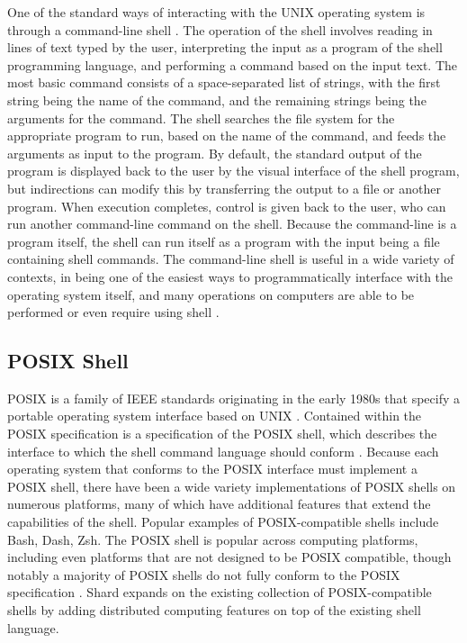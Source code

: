 \documentclass[twoside]{report}
\begin{document}
One of the standard ways of interacting with the UNIX operating system is through a command-line shell \cite{10.1145/361011.361061}.
The operation of the shell involves reading in lines of text typed by the user, interpreting the input as a program of the shell programming language, and performing a command based on the input text.
The most basic command consists of a space-separated list of strings, with the first string being the name of the command, and the remaining strings being the arguments for the command.
The shell searches the file system for the appropriate program to run, based on the name of the command, and feeds the arguments as input to the program.
By default, the standard output of the program is displayed back to the user by the visual interface of the shell program, but indirections can modify this by transferring the output to a file or another program.
When execution completes, control is given back to the user, who can run another command-line command on the shell.
Because the command-line is a program itself, the shell can run itself as a program with the input being a file containing shell commands.
The command-line shell is useful in a wide variety of contexts, in being one of the easiest ways to programmatically interface with the operating system itself, and many operations on computers are able to be performed or even require using shell \cite{10.1145/3371111}.

\subsection{POSIX Shell}
POSIX is a family of IEEE standards originating in the early 1980s that specify a portable operating system interface based on UNIX \cite{10.1145/210308.210315}.
Contained within the POSIX specification is a specification of the POSIX shell, which describes the interface to which the shell command language should conform \cite{posix2017}.
Because each operating system that conforms to the POSIX interface must implement a POSIX shell, there have been a wide variety implementations of POSIX shells on numerous platforms, many of which have additional features that extend the capabilities of the shell.
Popular examples of POSIX-compatible shells include Bash, Dash, Zsh.
The POSIX shell is popular across computing platforms, including even platforms that are not designed to be POSIX compatible, though notably a majority of POSIX shells do not fully conform to the POSIX specification \cite{10.1145/3371111}.
Shard expands on the existing collection of POSIX-compatible shells by adding distributed computing features on top of the existing shell language.
\end{document}
